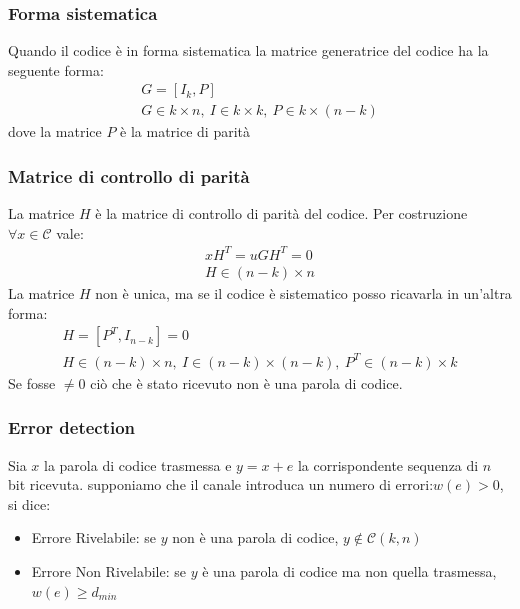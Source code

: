         \subsubsection{Forma sistematica}
            Quando il codice è in forma sistematica la matrice generatrice del codice ha la seguente forma:
            \begin{gather}
                G = [I_k,P]\nonumber \\
                G\in k\times n,\ I\in k\times k,\ P\in k\times (n-k)\nonumber
            \end{gather}
            dove la matrice $P$ è la matrice di parità
        \subsubsection{Matrice di controllo di parità}
            La matrice $H$ è la matrice di controllo di parità del codice. Per costruzione $\forall x \in \mathcal{C}$ vale:
            \begin{gather}
                    xH^T = uGH^T = 0 \nonumber \\
                    H\in (n-k) \times n\nonumber 
            \end{gather}
            La matrice $H$ non è unica, ma se il codice è sistematico posso ricavarla in un'altra forma:
            \begin{gather}
                H = [P^T,I_{n-k}] = 0 \nonumber \\
                H\in (n-k) \times n,\ I\in (n-k)\times (n-k),\ P^T\in (n-k) \times k \nonumber
            \end{gather}
            Se fosse $\neq 0$ ciò che è stato ricevuto non è una parola di codice.
        \subsubsection{Error detection}
            Sia $x$ la parola di codice trasmessa e $y=x+e$ la corrispondente sequenza di $n$ bit ricevuta. supponiamo che il canale 
            introduca un numero di errori:$w(e) > 0$, si dice:
            \begin{itemize}
                \item {
                    Errore Rivelabile: se $y$ non è una parola di codice, $y\notin\mathcal{C}(k,n) $
                }
                \item {
                    Errore Non Rivelabile: se $y$ è una parola di codice ma non quella trasmessa, $w(e) \geq d_{min}$ 
                }
            \end{itemize}
